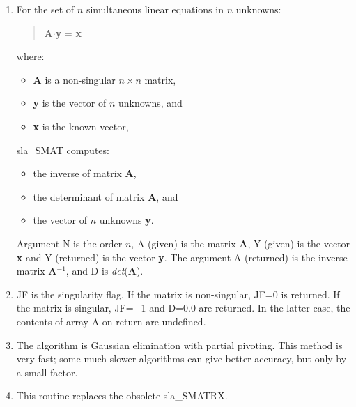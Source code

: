 {
 \begin{enumerate}
  \item For the set of $n$ simultaneous linear equations in $n$ unknowns:
        \begin{verse}
         {\bf A}$\cdot${\bf y} = {\bf x}
        \end{verse}
        where:
        \begin{itemize}
         \item {\bf A} is a non-singular $n \times n$ matrix,
         \item {\bf y} is the vector of $n$ unknowns, and
         \item {\bf x} is the known vector,
        \end{itemize}
        sla\_SMAT computes:
        \begin{itemize}
         \item the inverse of matrix {\bf A},
         \item the determinant of matrix {\bf A}, and
         \item the vector of $n$ unknowns {\bf y}.
        \end{itemize}
        Argument N is the order $n$, A (given) is the matrix {\bf A},
        Y (given) is the vector {\bf x} and Y (returned)
        is the vector {\bf y}.
        The argument A (returned) is the inverse matrix {\bf A}$^{-1}$,
        and D is {\it det}({\bf A}).
  \item JF is the singularity flag.  If the matrix is non-singular,
        JF=0 is returned.  If the matrix is singular, JF=$-$1
        and D=0.0 are returned.  In the latter case, the contents
        of array A on return are undefined.
  \item The algorithm is Gaussian elimination with partial pivoting.
        This method is very fast;  some much slower algorithms can give
        better accuracy, but only by a small factor.
  \item This routine replaces the obsolete sla\_SMATRX.
 \end{enumerate}
}
{
}
{
  \\
}
